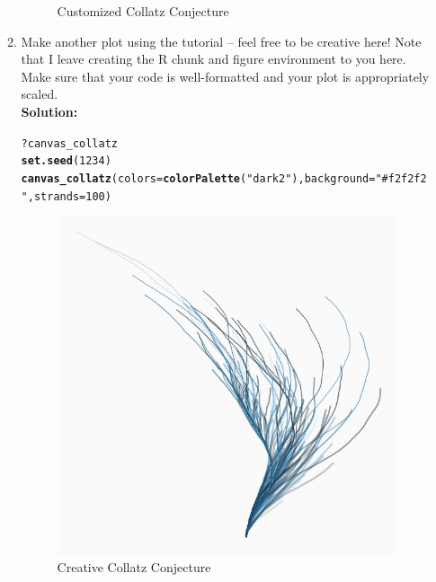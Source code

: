 \documentclass{article}\usepackage[]{graphicx}\usepackage[]{xcolor}
\makeatletter
\def\maxwidth{ %
  \ifdim\Gin@nat@width>\linewidth
    \linewidth
  \else
    \Gin@nat@width
  \fi
}
\newcommand{\hlnum}[1]{\textcolor[rgb]{0.686,0.059,0.569}{#1}}%
\newcommand{\hlsng}[1]{\textcolor[rgb]{0.192,0.494,0.8}{#1}}%
\newcommand{\hlopt}[1]{\textcolor[rgb]{0,0,0}{#1}}%
\newcommand{\hldef}[1]{\textcolor[rgb]{0.345,0.345,0.345}{#1}}%
\newcommand{\hlkwc}[1]{\textcolor[rgb]{0.333,0.667,0.333}{#1}}%
\newcommand{\hlkwd}[1]{\textcolor[rgb]{0.737,0.353,0.396}{\textbf{#1}}}%
\newenvironment{kframe}{%
 \def\at@end@of@kframe{}%
 \ifinner\ifhmode%
  \def\at@end@of@kframe{\end{minipage}}%
  \begin{minipage}{\columnwidth}%
 \fi\fi%
 \def\FrameCommand##1{\hskip\@totalleftmargin \hskip-\fboxsep
 \colorbox{shadecolor}{##1}\hskip-\fboxsep
     \hskip-\linewidth \hskip-\@totalleftmargin \hskip\columnwidth}%
 \MakeFramed {\advance\hsize-\width
   \@totalleftmargin\z@ \linewidth\hsize
   \@setminipage}}%
 {\par\unskip\endMakeFramed%
 \at@end@of@kframe}
\newenvironment{knitrout}{}{} %
\makeatother
\begin{document}
\begin{enumerate}
\begin{enumerate}
\begin{figure}[H]
\begin{center}
\begin{knitrout}
\end{knitrout}
\caption{Customized Collatz Conjecture}
\label{CollatzPlot3}
\end{center}
\end{figure}
  \item Make another plot using the tutorial -- feel free to be creative here!
  Note that I leave creating the R chunk and figure environment to you here.
  Make sure that your code is well-formatted and your plot is appropriately scaled.\\
  \textbf{Solution:}
\begin{knitrout}\scriptsize
{}\color{fgcolor}\begin{kframe}
\begin{alltt}
\hlopt{?}\hldef{canvas_collatz}
\hlkwd{set.seed}\hldef{(}\hlnum{1234}\hldef{)}
\hlkwd{canvas_collatz}\hldef{(}\hlkwc{colors} \hldef{=} \hlkwd{colorPalette}\hldef{(}\hlsng{"dark2"}\hldef{),} \hlkwc{background} \hldef{=} \hlsng{"#f2f2f2"}\hldef{,} \hlkwc{strands} \hldef{=} \hlnum{100}\hldef{)}
\end{alltt}
\end{kframe}
\end{knitrout}
\begin{figure}[H]
\begin{center}
\begin{knitrout}
\color{fgcolor}
\includegraphics[width=\maxwidth]{figure/unnamed-chunk-6-1} 
\end{knitrout}
\caption{Creative Collatz Conjecture}
\label{CreativeCollatz}
\end{center}
\end{figure}


\end{enumerate}
\end{enumerate}
\end{document}
